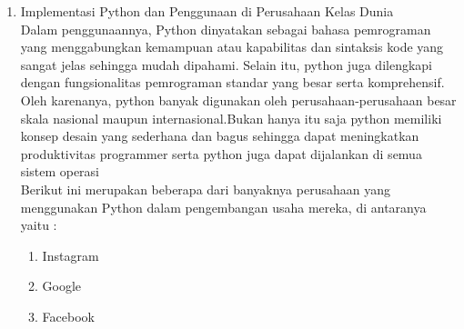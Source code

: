 \begin{enumerate}
\begin{itemize}
\end{itemize}
	\item Implementasi Python dan Penggunaan di Perusahaan Kelas Dunia\\
	Dalam penggunaannya, Python dinyatakan sebagai bahasa pemrograman  yang menggabungkan kemampuan atau kapabilitas dan sintaksis kode yang sangat jelas sehingga mudah dipahami. Selain itu, python juga dilengkapi dengan fungsionalitas pemrograman standar yang besar serta komprehensif. Oleh karenanya, python banyak digunakan oleh perusahaan-perusahaan besar skala nasional maupun internasional.Bukan hanya itu saja python memiliki konsep desain yang sederhana dan bagus sehingga dapat meningkatkan produktivitas programmer serta python juga dapat dijalankan di semua sistem operasi \\
	Berikut ini merupakan beberapa dari banyaknya perusahaan yang menggunakan Python dalam pengembangan usaha mereka, di antaranya yaitu :
	\begin{enumerate}
		\item Instagram
		\item Google
		\item Facebook
	\end{enumerate}

\end{enumerate}
